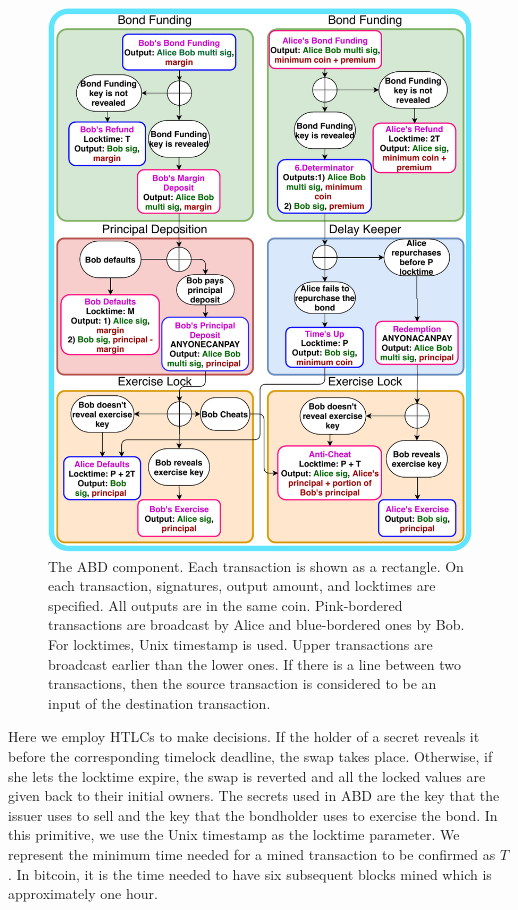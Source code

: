 \begin{figure}[h]
  \centering
  \includegraphics[width=\linewidth]{figures/bond-first.pdf}
  \caption{The ABD component. Each transaction is shown as a rectangle. On each transaction, signatures, output amount, and locktimes are specified. All outputs are in the same coin. Pink-bordered transactions are broadcast by Alice and blue-bordered ones by Bob. For locktimes, Unix timestamp is used. Upper transactions are broadcast earlier than the lower ones. If there is a line between two transactions, then the source transaction is considered to be an input of the destination transaction.}
  \label{fig:non-collat-bond-no-checkseq}
\end{figure}

Here\new{,} we employ HTLCs to make decisions. If the holder of a secret reveals it before the corresponding timelock deadline, the swap takes place. Otherwise, if she lets the locktime expire, the swap is reverted and all the locked values are given back to their initial owners. The secrets used in ABD are the {\it \Aone} key that the issuer uses to sell and the {\it \keyone} key that the bondholder uses to exercise the bond. In this primitive, we use the Unix timestamp as the locktime parameter. We represent the minimum time needed for a mined transaction to be confirmed as $T$. In bitcoin, it is the time needed to have six subsequent blocks mined which is approximately one hour.

